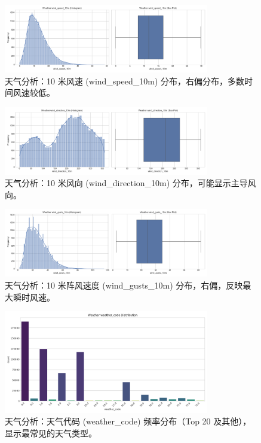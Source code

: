 \documentclass{article} %
\begin{document}
\begin{figure}[H]
    \centering
    \includegraphics[width=0.8\textwidth]{../plots/weather_distribution_wind_speed_10m.png}
    \caption{天气分析：10 米风速 (wind\_speed\_10m) 分布，右偏分布，多数时间风速较低。} %
    \label{fig:weather_dist_wind}
\end{figure}

\begin{figure}[H]
    \centering
    \includegraphics[width=0.8\textwidth]{../plots/weather_distribution_wind_direction_10m.png}
    \caption{天气分析：10 米风向 (wind\_direction\_10m) 分布，可能显示主导风向。} %
    \label{fig:weather_dist_wind_dir}
\end{figure}

\begin{figure}[H]
    \centering
    \includegraphics[width=0.8\textwidth]{../plots/weather_distribution_wind_gusts_10m.png}
    \caption{天气分析：10 米阵风速度 (wind\_gusts\_10m) 分布，右偏，反映最大瞬时风速。} %
    \label{fig:weather_dist_wind_gusts}
\end{figure}

\begin{figure}[H]
    \centering
    \includegraphics[width=0.8\textwidth]{../plots/weather_distribution_weather_code.png}
    \caption{天气分析：天气代码 (weather\_code) 频率分布（Top 20 及其他），显示最常见的天气类型。} %
    \label{fig:weather_dist_code}
\end{figure}
\end{document}
